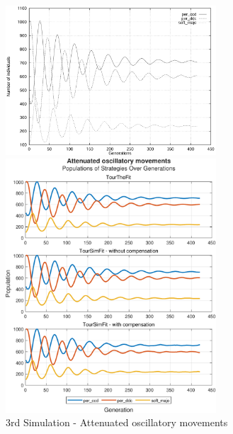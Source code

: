 \documentclass[12pt]{article}
\begin{document}
	\begin{figure}[h]
	      \centering
		  \includegraphics[width=0.7\textwidth]{RefPaperFigures/fig3.jpeg}\par\vspace{0.5em}
	      \includegraphics[width=0.7\textwidth]{Attenuated oscillatory movements.pdf}
	      \caption{3rd Simulation - Attenuated oscillatory movements}
	      \label{fig:Attenuated oscillatory movements}
	\end{figure}
\end{document}
